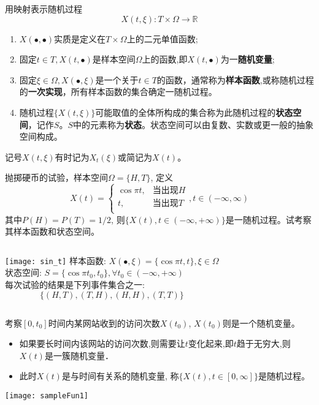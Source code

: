 \begin{frame}{用映射表示随机过程} 
\[X(t,\xi): T\times\Omega\to\mathbb{R} \]
\begin{enumerate}
	\item $X(\bullet,\bullet)$实质是定义在$T\times\Omega$上的二元单值函数;
	\item 固定$t\in T,X(t,\bullet)$是样本空间$\Omega$上的函数,即$X(t,\bullet)$为一\textbf{随机变量};
	\item 固定$\xi\in\Omega,X(\bullet,\xi)$是一个关于$t\in T$的函数，通常称为\textbf{样本函数},或称随机过程的\textbf{一次实现}，所有样本函数的集合确定一随机过程。
	\item 随机过程$\{X(t,\xi)\}$可能取值的全体所构成的集合称为此随机过程的\textbf{状态空间}，记作$S$。$S$中的元素称为\textbf{状态}。状态空间可以由复数、实数或更一般的抽象空间构成。
\end{enumerate}

记号$X(t,\xi)$有时记为$X_t(\xi)$或简记为$X(t)$。
\end{frame}

\begin{frame}
\begin{example}[随机过程示例]
	抛掷硬币的试验，样本空间$\Omega=\{H,T\}$, 定义
	\[X(t)=\begin{cases}
	\cos\pi t, &\text{当出现$H$}\\
	t, &\text{当出现$T$}\\ 
	\end{cases}, t\in(-\infty,\infty)\]
	其中$P(H)=P(T)=1/2$, 则$\{X(t), t\in (-\infty, +\infty)\}$是一随机过程。试考察其样本函数和状态空间。
\end{example}

\medskip
\begin{columns}
	\texttt{[image: sin\_t]}
	样本函数: $X(\bullet,\xi)=\{\cos\pi t, t\}, \xi\in \Omega$\\
	状态空间: $S=\{\cos\pi t_0, t_0\}, \forall t_0\in (-\infty, +\infty)$\\
	每次试验的结果是下列事件集合之一:
	\[ \{(H,T),(T,H),(H,H),(T,T)\} \]
\end{columns}
\end{frame}

\begin{frame}
\begin{example}
	考察$[0,t_0]$时间内某网站收到的访问次数$X(t_0)$, $X(t_0)$则是一个随机变量。
	\begin{itemize}
		\item 如果要长时间内该网站的访问次数,则需要让$t$变化起来,即$t$趋于无穷大,则$X(t)$是一簇随机变量．
		\item 此时$X(t)$是与时间有关系的随机变量, 称$\{X(t),t\in[0,\infty]\}$是随机过程。
	\end{itemize}
\end{example}
\texttt{[image: sampleFun1]}	
\end{frame}

